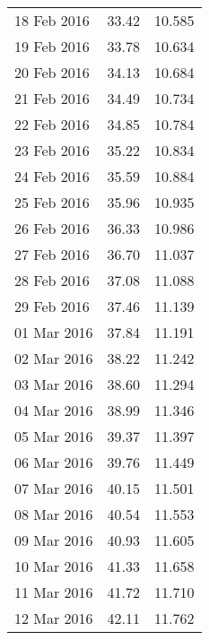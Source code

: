 \documentclass[11pt,a4paper,twoside]{article}
\begin{document}
\begin{longtable}{lcc}
18 Feb 2016                    & 33.42                & 10.585     \\
19 Feb 2016                    & 33.78                & 10.634     \\
20 Feb 2016                    & 34.13                & 10.684     \\
21 Feb 2016                    & 34.49                & 10.734     \\
22 Feb 2016                    & 34.85                & 10.784     \\
23 Feb 2016                    & 35.22                & 10.834     \\
24 Feb 2016                    & 35.59                & 10.884     \\
25 Feb 2016                    & 35.96                & 10.935     \\
26 Feb 2016                    & 36.33                & 10.986     \\
27 Feb 2016                    & 36.70                & 11.037     \\
28 Feb 2016                    & 37.08                & 11.088     \\
29 Feb 2016                    & 37.46                & 11.139     \\
01 Mar 2016                    & 37.84                & 11.191     \\
02 Mar 2016                    & 38.22                & 11.242     \\
03 Mar 2016                    & 38.60                & 11.294     \\
04 Mar 2016                    & 38.99                & 11.346     \\
05 Mar 2016                    & 39.37                & 11.397     \\
06 Mar 2016                    & 39.76                & 11.449     \\
07 Mar 2016                    & 40.15                & 11.501     \\
08 Mar 2016                    & 40.54                & 11.553     \\
09 Mar 2016                    & 40.93                & 11.605     \\
10 Mar 2016                    & 41.33                & 11.658     \\
11 Mar 2016                    & 41.72                & 11.710     \\
12 Mar 2016                    & 42.11                & 11.762     \\

\end{longtable}
\end{document}
